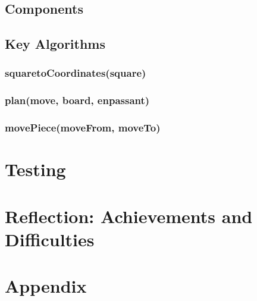 \documentclass[onecolumn]{IEEEtran}
\begin{document}
\subsection{Components}
\subsection{Key Algorithms}
\subsubsection{squaretoCoordinates(square)}
\subsubsection{plan(move, board, enpassant)}
\subsubsection{movePiece(moveFrom, moveTo)}
\section{Testing}
\section{Reflection: Achievements and Difficulties}
\section{Appendix}




    
\end{document}
